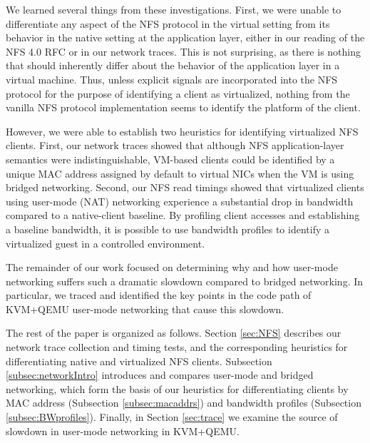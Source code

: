 \documentclass[letterpaper,twocolumn,11pt]{article}
\begin{document}
We learned several things from these investigations. First, we were unable to differentiate any aspect of the NFS protocol in the virtual setting from its behavior in the native setting at the application layer, either in our reading of the NFS 4.0 RFC or in our network traces. This is not surprising, as there is nothing that should inherently differ about the behavior of the application layer in a virtual machine. Thus, unless explicit signals are incorporated into the NFS protocol for the purpose of identifying a client as virtualized, nothing from the vanilla NFS protocol implementation seems to identify the platform of the client. 

However, we were able to establish two heuristics for identifying virtualized NFS clients. First, our network traces showed that although NFS application-layer semantics were indistinguishable, VM-based clients could be identified by a unique MAC address assigned by default to virtual NICs when the VM is using bridged networking. Second, our NFS read timings showed that virtualized clients using user-mode (NAT) networking experience a substantial drop in bandwidth compared to a native-client baseline. By profiling client accesses and establishing a baseline bandwidth, it is possible to use bandwidth profiles to identify a virtualized guest in a controlled environment.

The remainder of our work focused on determining why and how user-mode networking suffers such a dramatic slowdown compared to bridged networking. In particular, we traced and identified the key points in the code path of KVM+QEMU user-mode networking that cause this slowdown.

The rest of the paper is organized as follows. Section \ref{sec:NFS} describes our network trace collection and timing tests, and the corresponding heuristics for differentiating native and
virtualized NFS clients. Subsection \ref{subsec:networkIntro} introduces and compares user-mode and bridged networking, which form the basis of our heuristics for differentiating clients by MAC address (Subsection \ref{subsec:macaddrs}) and bandwidth profiles (Subsection \ref{subsec:BWprofiles}). Finally, in Section \ref{sec:trace} we examine the source of slowdown in user-mode networking in KVM+QEMU.


%
\end{document}
